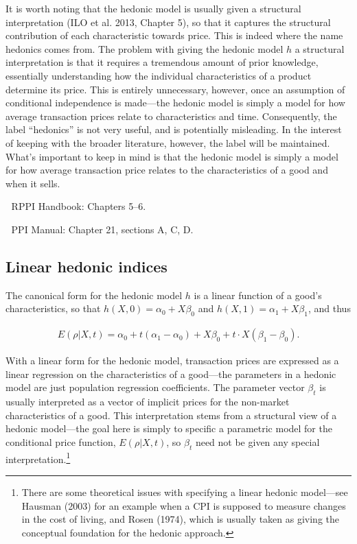 \documentclass[]{article}
\begin{document}
It is worth noting that the hedonic model is usually given a structural interpretation (ILO et al. 2013, Chapter 5), so that it captures the structural contribution of each characteristic towards price. This is indeed where the name hedonics comes from. The problem with giving the hedonic model \(h\) a structural interpretation is that it requires a tremendous amount of prior knowledge, essentially understanding how the individual characteristics of a product determine its price. This is entirely unnecessary, however, once an assumption of conditional independence is made---the hedonic model is simply a model for how average transaction prices relate to characteristics and time. Consequently, the label ``hedonics'' is not very useful, and is potentially misleading. In the interest of keeping with the broader literature, however, the label will be maintained. What's important to keep in mind is that the hedonic model is simply a model for how average transaction price relates to the characteristics of a good and when it sells.

📖 RPPI Handbook: Chapters 5--6.

📖 PPI Manual: Chapter 21, sections A, C, D.

\hypertarget{linear-hedonic-indices}{%
\subsection{Linear hedonic indices}\label{linear-hedonic-indices}}

The canonical form for the hedonic model \(h\) is a linear function of a good's characteristics, so that \(h(X, 0) = \alpha_{0} + X\beta_{0}\) and \(h(X, 1) = \alpha_{1} + X\beta_{1}\), and thus

\begin{align*}
E(\rho | X, t) = \alpha_{0} + t(\alpha_{1} - \alpha_{0}) + X\beta_{0} + t \cdot X (\beta_{1} - \beta_{0}).
\end{align*}

With a linear form for the hedonic model, transaction prices are expressed as a linear regression on the characteristics of a good---the parameters in a hedonic model are just population regression coefficients. The parameter vector \(\beta_{t}\) is usually interpreted as a vector of implicit prices for the non-market characteristics of a good. This interpretation stems from a structural view of a hedonic model---the goal here is simply to specific a parametric model for the conditional price function, \(E(\rho | X, t)\), so \(\beta_{t}\) need not be given any special interpretation.\footnote{There are some theoretical issues with specifying a linear hedonic model---see Hausman (2003) for an example when a CPI is supposed to measure changes in the cost of living, and Rosen (1974), which is usually taken as giving the conceptual foundation for the hedonic approach.}
\end{document}
